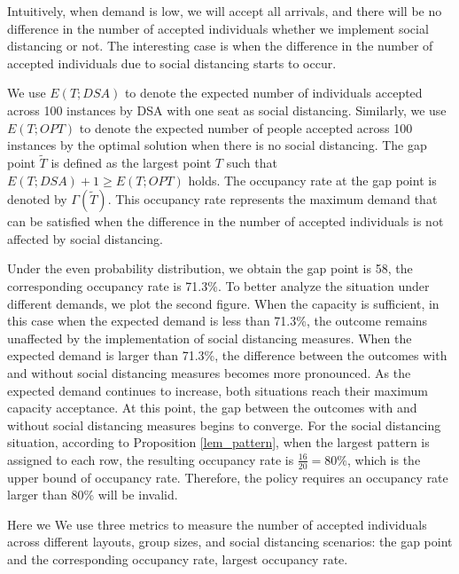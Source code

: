 Intuitively, when demand is low, we will accept all arrivals, and there will be no difference in the number of accepted individuals whether we implement social distancing or not. The interesting case is when the difference in the number of accepted individuals due to social distancing starts to occur.

We use $E(T; DSA)$ to denote the expected number of individuals accepted across 100 instances by DSA with one seat as social distancing. Similarly, we use $E(T; OPT)$ to denote the expected number of people accepted across 100 instances by the optimal solution when there is no social distancing. The gap point $\tilde{T}$ is defined as the largest point $T$ such that $E(T; DSA)+1 \geq E(T; OPT)$ holds. The occupancy rate at the gap point is denoted by $\Gamma(\tilde{T})$. This occupancy rate represents the maximum demand that can be satisfied when the difference in the number of accepted individuals is not affected by social distancing.


Under the even probability distribution, we obtain the gap point is 58, the corresponding occupancy rate is 71.3\%. To better analyze the situation under different demands, we plot the second figure. When the capacity is sufficient, in this case when the expected demand is less than 71.3\%, the outcome remains unaffected by the implementation of social distancing measures. When the expected demand is larger than 71.3\%, the difference between the outcomes with and without social distancing measures becomes more pronounced. As the expected demand continues to increase, both situations reach their maximum capacity acceptance. At this point, the gap between the outcomes with and without social distancing measures begins to converge. For the social distancing situation, according to Proposition \ref{lem_pattern}, when the largest pattern is assigned to each row, the resulting occupancy rate is $\frac{16}{20} = 80\%$, which is the upper bound of occupancy rate. Therefore, the policy requires an occupancy rate larger than 80\% will be invalid.


Here we 
We use three metrics to measure the number of accepted individuals across different layouts, group sizes, and social distancing scenarios: the gap point and the corresponding occupancy rate, largest occupancy rate.

